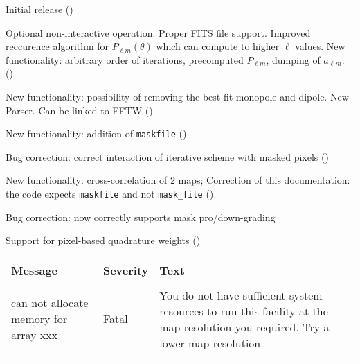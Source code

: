 \begin{release}
  \begin{relist}
    \item Initial release ()
    \item Optional non-interactive operation. Proper FITS file
    support. Improved reccurence algorithm for $P_{\ell m}(\theta)$ which can compute to higher $\ell$ values. New functionality: arbitrary order of iterations, precomputed
    $P_{\ell m}$, dumping of $a_{\ell m}$. ()
    \item New functionality: possibility of removing the best fit monopole
    and dipole. New Parser. Can be linked to FFTW ()
    \item New functionality: addition of {\tt{maskfile}} ()
    \item Bug correction: correct interaction of iterative scheme with masked pixels ()
    \item New functionality: cross-correlation of 2 maps; Correction of this documentation: the code expects {\tt maskfile} and
not {\tt mask\_file}  ()
    \item Bug correction: now correctly supports mask pro/down-grading
    \item Support for pixel-based quadrature weights ()
  \end{relist}
\end{release}

\begin{messages}
{
\begin{tabular}{p{0.25\hsize} p{0.1\hsize} p{0.35\hsize}} \hline  
  \textbf{Message} & \textbf{Severity} & \textbf{Text} \\ \hline
                   &                   &   \\ %
can not allocate memory for array xxx &  Fatal & You do not have
                   sufficient system resources to run this
                   facility at the map resolution you required. 
  Try a lower map resolution.  \\ 
                   &                   &   \\ \hline %
\end{tabular}
} 
\end{messages}
%
\newpage
%
